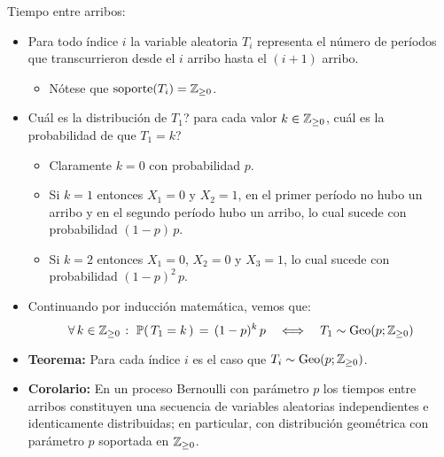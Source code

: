 \documentclass[ 10pt, xcolor = dvipsnames]{beamer}
\begin{document}
\begin{frame}[allowframebreaks]
\frametitle{\insertsection}

Tiempo entre arribos: 
\begin{itemize}
\item Para todo \'indice $i$ la variable aleatoria $T_i$ representa el n\'umero de per\'iodos que transcurrieron desde el $i$ arribo hasta el $(i+1)$ arribo. 
\begin{itemize}
\item N\'otese que $\text{soporte}(T_i) = {\mathbb{Z}}_{\geq 0}$. 
\end{itemize}
\item Cu\'al es la distribuci\'on de $T_1$? \Ie para cada valor $k \in {\mathbb{Z}}_{\geq 0}$, cu\'al es la \linebreak probabilidad de que $T_1 = k$? 
\begin{itemize}
\item Claramente $k = 0$ con probabilidad $p$. 
\item Si $k = 1$ entonces $X_1 = 0$ y $X_2 = 1$, \ie en el primer per\'iodo no hubo un arribo y en el segundo per\'iodo hubo un arribo, lo cual sucede con \linebreak probabilidad $(1-p) \, p$. 
\item Si $k = 2$ entonces $X_1 = 0$, $X_2 = 0$ y $X_3 = 1$, lo cual sucede con \linebreak probabilidad $(1-p)^2 \, p$. 
\end{itemize}
\framebreak
\item Continuando por inducci\'on matem\'atica, vemos que: 
\[
\forall \, k \in {\mathbb{Z}}_{\geq 0} \; \colon \; 
\mathbb{P}( \, T_1 = k \, ) \, = \, (1-p)^k \, p 
\quad \Longleftrightarrow \quad T_1 \sim \text{Geo}(p;{\mathbb{Z}}_{\geq 0})
\]
\item \textbf{Teorema:} Para cada \'indice $i$ es el caso que $T_i \sim \text{Geo}(p;{\mathbb{Z}}_{\geq 0})$. 
\item \textbf{Corolario:} En un proceso Bernoulli con par\'ametro $p$ los tiempos entre arribos constituyen una secuencia de variables aleatorias independientes e identicamente distribuidas; en particular, con distribuci\'on geom\'etrica con par\'ametro $p$ soportada en ${\mathbb{Z}}_{\geq 0}$. 
\end{itemize}

\end{frame}
\end{document}
